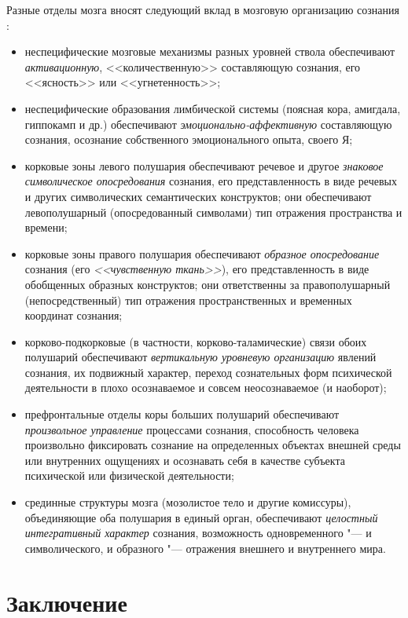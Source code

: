 \documentclass[a4paper,12pt]{article}
\begin{document}
	Разные отделы мозга вносят следующий вклад в мозговую организацию сознания \cite{Homskaya2015}:
	\begin{itemize}
		\item неспецифические мозговые механизмы разных уровней ствола обеспечивают \textit{активационную}, <<количественную>> составляющую сознания, его <<ясность>> или <<угнетенность>>;
		\item неспецифические образования лимбической системы (поясная кора, амигдала, гиппокамп и др.) обеспечивают \textit{эмоционально-аффективную} составляющую сознания, осознание собственного эмоционального опыта, своего Я;
		\item корковые зоны левого полушария обеспечивают речевое и другое \textit{знаковое символическое опосредования} сознания, его представленность в виде речевых и других символических семантических конструктов; они обеспечивают левополушарный (опосредованный символами) тип отражения пространства и времени;
		\item корковые зоны правого полушария обеспечивают \textit{образное опосредование} сознания (его \textit{<<чувственную ткань>>}), его представленность в виде обобщенных образных конструктов; они ответственны за правополушарный (непосредственный) тип отражения пространственных и временных координат сознания;
		\item корково-подкорковые (в частности, корково-таламические) связи обоих полушарий обеспечивают \textit{вертикальную уровневую организацию} явлений сознания, их подвижный характер, переход сознательных форм психической деятельности в плохо осознаваемое и совсем неосознаваемое (и наоборот);
		\item префронтальные отделы коры больших полушарий обеспечивают \textit{произвольное управление} процессами сознания, способность человека произвольно фиксировать сознание на определенных объектах внешней среды или внутренних ощущениях и осознавать себя в качестве субъекта психической или физической деятельности;
		\item срединные структуры мозга (мозолистое тело и другие комиссуры), объединяющие оба полушария в единый орган, обеспечивают \textit{целостный интегративный характер} сознания, возможность одновременного "--- и символического, и образного "--- отражения внешнего и внутреннего мира.
	\end{itemize}
	
 	\section*{Заключение}
	
   \printbibliography
\end{document}

